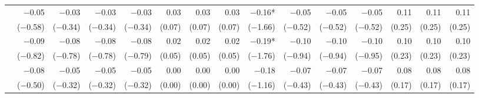 \begin{tabularx}{1.45\textwidth}{lRRRRRRRRRRRRRR}
		 & \num{-0.05}\phantom{***)} & \num{-0.03}\phantom{***)} & \num{-0.03}\phantom{***)} & \num{-0.03}\phantom{***)} & \num{0.03}\phantom{***)} & \num{0.03}\phantom{***)} & \num{0.03}\phantom{***)} & \num{-0.16}*\phantom{**)} & \num{-0.05}\phantom{***)} & \num{-0.05}\phantom{***)} & \num{-0.05}\phantom{***)} & \num{0.11}\phantom{***)} & \num{0.11}\phantom{***)} & \num{0.11}\phantom{***)} \\
		 & (\num{-0.58})\phantom{***} & (\num{-0.34})\phantom{***} & (\num{-0.34})\phantom{***} & (\num{-0.34})\phantom{***} & (\num{0.07})\phantom{***} & (\num{0.07})\phantom{***} & (\num{0.07})\phantom{***} & (\num{-1.66})\phantom{***} & (\num{-0.52})\phantom{***} & (\num{-0.52})\phantom{***} & (\num{-0.52})\phantom{***} & (\num{0.25})\phantom{***} & (\num{0.25})\phantom{***} & (\num{0.25})\phantom{***} \\ [\dspacing]
		 & \num{-0.09}\phantom{***)} & \num{-0.08}\phantom{***)} & \num{-0.08}\phantom{***)} & \num{-0.08}\phantom{***)} & \num{0.02}\phantom{***)} & \num{0.02}\phantom{***)} & \num{0.02}\phantom{***)} & \num{-0.19}*\phantom{**)} & \num{-0.10}\phantom{***)} & \num{-0.10}\phantom{***)} & \num{-0.10}\phantom{***)} & \num{0.10}\phantom{***)} & \num{0.10}\phantom{***)} & \num{0.10}\phantom{***)} \\
		 & (\num{-0.82})\phantom{***} & (\num{-0.78})\phantom{***} & (\num{-0.78})\phantom{***} & (\num{-0.79})\phantom{***} & (\num{0.05})\phantom{***} & (\num{0.05})\phantom{***} & (\num{0.05})\phantom{***} & (\num{-1.76})\phantom{***} & (\num{-0.94})\phantom{***} & (\num{-0.94})\phantom{***} & (\num{-0.95})\phantom{***} & (\num{0.23})\phantom{***} & (\num{0.23})\phantom{***} & (\num{0.23})\phantom{***} \\ [\dspacing]
		 & \num{-0.08}\phantom{***)} & \num{-0.05}\phantom{***)} & \num{-0.05}\phantom{***)} & \num{-0.05}\phantom{***)} & \num{0.00}\phantom{***)} & \num{0.00}\phantom{***)} & \num{0.00}\phantom{***)} & \num{-0.18}\phantom{***)} & \num{-0.07}\phantom{***)} & \num{-0.07}\phantom{***)} & \num{-0.07}\phantom{***)} & \num{0.08}\phantom{***)} & \num{0.08}\phantom{***)} & \num{0.08}\phantom{***)} \\
		 & (\num{-0.50})\phantom{***} & (\num{-0.32})\phantom{***} & (\num{-0.32})\phantom{***} & (\num{-0.32})\phantom{***} & (\num{0.00})\phantom{***} & (\num{0.00})\phantom{***} & (\num{0.00})\phantom{***} & (\num{-1.16})\phantom{***} & (\num{-0.43})\phantom{***} & (\num{-0.43})\phantom{***} & (\num{-0.43})\phantom{***} & (\num{0.17})\phantom{***} & (\num{0.17})\phantom{***} & (\num{0.17})\phantom{***} \\ [\dspacing]

\end{tabularx}
